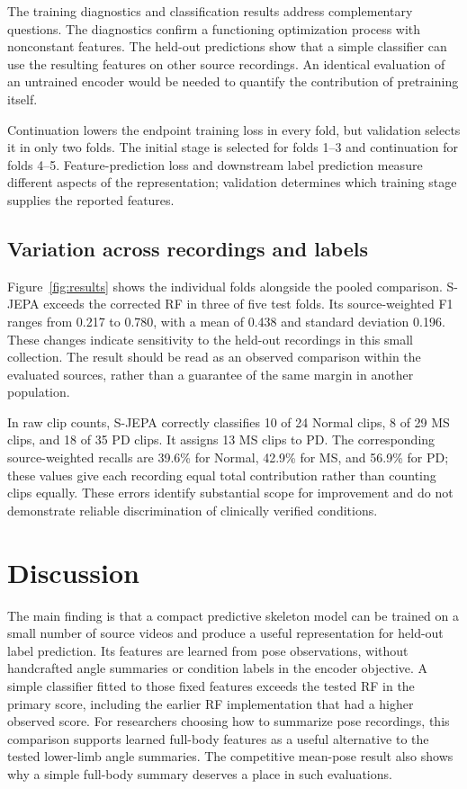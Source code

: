\documentclass[10pt,twocolumn,letterpaper]{article}
\begin{document}
The training diagnostics and classification results address complementary questions. The diagnostics confirm a functioning optimization process with nonconstant features. The held-out predictions show that a simple classifier can use the resulting features on other source recordings. An identical evaluation of an untrained encoder would be needed to quantify the contribution of pretraining itself.

Continuation lowers the endpoint training loss in every fold, but validation selects it in only two folds. The initial stage is selected for folds 1--3 and continuation for folds 4--5. Feature-prediction loss and downstream label prediction measure different aspects of the representation; validation determines which training stage supplies the reported features.



\subsection{Variation across recordings and labels}
Figure~\ref{fig:results} shows the individual folds alongside the pooled comparison.
S-JEPA exceeds the corrected RF in three of five test folds. Its source-weighted F1 ranges from 0.217 to 0.780, with a mean of 0.438 and standard deviation 0.196. These changes indicate sensitivity to the held-out recordings in this small collection. The result should be read as an observed comparison within the evaluated sources, rather than a guarantee of the same margin in another population.

In raw clip counts, S-JEPA correctly classifies 10 of 24 Normal clips, 8 of 29 MS clips, and 18 of 35 PD clips. It assigns 13 MS clips to PD. The corresponding source-weighted recalls are 39.6\% for Normal, 42.9\% for MS, and 56.9\% for PD; these values give each recording equal total contribution rather than counting clips equally. These errors identify substantial scope for improvement and do not demonstrate reliable discrimination of clinically verified conditions.

\FloatBarrier
\section{Discussion}
\label{sec:discussion}
The main finding is that a compact predictive skeleton model can be trained on a small number of source videos and produce a useful representation for held-out label prediction. Its features are learned from pose observations, without handcrafted angle summaries or condition labels in the encoder objective. A simple classifier fitted to those fixed features exceeds the tested RF in the primary score, including the earlier RF implementation that had a higher observed score. For researchers choosing how to summarize pose recordings, this comparison supports learned full-body features as a useful alternative to the tested lower-limb angle summaries. The competitive mean-pose result also shows why a simple full-body summary deserves a place in such evaluations.
\end{document}
